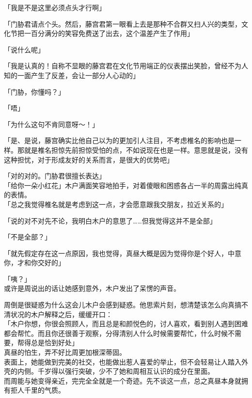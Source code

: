 「我是不是这里必须点头才行啊」

「门胁君请点个头。然后，藤宫君第一眼看上去是那种不合群又扫人兴的类型，文化节把一百分满分的笑容免费送了出去，这个温差产生了作用」

「说什么呢」

「我是认真的！自称不显眼的藤宫君在文化节用端正的仪表摆出笑脸，曾经不为人知的一面产生了反差，会让一部分人心动的」

「门胁，你懂吗？」

「唔」

「为什么这句不肯同意呀～！」

「是、是说，藤宫确实比他自己以为的更加引人注目，不考虑椎名的影响也是一样。那就是椎名担惊先前担惊受怕的点，不如说现在也是一样。意思就是说，没有这种担忧，对于形成友好的关系而言，是很大的优势吧」

「对的对的。门胁君很擅长表达」\\

「给你一朵小红花」木户满面笑容地拍手，对着傻眼和困惑各占一半的周露出纯真的表情。\\

「总之我觉得椎名就是考虑到这一点，才会愿意跟我交朋友，拉近关系的」

「说的对不对先不论，我明白木户的意思了……但我觉得这并不是全部」

「不是全部？」

「就先假定存在这一点原因，我也觉得，真昼大概是因为觉得你是个好人，中意你，才和你交好的」

「咦？」\\

或许是周说出的话让她感到意外，木户发出了呆愣的声音。

周倒是很疑惑为什么这会儿木户会感到疑惑。他思索片刻，想清楚该怎么向真搞不清状况的木户解释之后，缓缓开口：\\

「木户你想，你很会照顾人，而且总是和颜悦色的，讨人喜欢，看到别人遇到困难都会帮忙。而且你还很善于观察，分得清别人什么时候需要帮忙，什么时候不需要，帮得总是恰到好处」\\

真昼的怕生，弄不好比周更加根深蒂固。\\

表面上，她能做到完美的社交，也能做出惹人喜爱的举止，但不会轻易让人踏入外壳的内侧。千岁得以强行突破，少不了她和周相互认识的成分在里面。\\

而周能与她变得亲近，完完全全就是一个奇迹。先不谈这一点，总之真昼本身就拥有拒人千里的气质。\\

